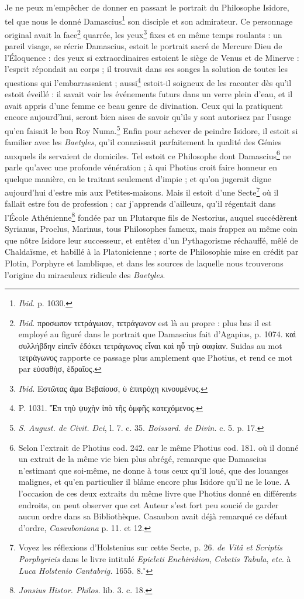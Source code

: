 \documentclass[a4paper, 11pt, oneside, polutonikogreek, french]{article}
\begin{document}
Je ne peux m'empêcher de donner en passant le portrait du Philosophe Isidore, tel que nous le donné Damascius\footnote{\emph{Ibid.} p. 1030.} son disciple et son admirateur. Ce personnage original avait la face\footnote{\emph{Ibid.} προσωπον τετράγωιον, τετράγωνον est là au propre : plus bas il est employé au figuré dans le portrait que Damascius fait d'Agapius, p. 1074. καὶ συλλήβδην εἰπεῖν ἐδόκει τετράγωνος εἶναι καὶ ηὖ τηὺ σαφἱαν. Suidas au mot τετράγωνος rapporte ce passage plus amplement que Photius, et rend ce mot par εὐσαθὴσ, ἑδραῖος.} quarrée, les yeux\footnote{\emph{Ibid.} Εστῶτας ἅμα Βεβαίουσ, ὺ ἐπιτρόχη κινουμένυς.} fixes et en même temps roulants : un pareil visage, se récrie Damascius, estoit le portrait sacré de Mercure Dieu de l'Éloquence : des yeux si extraordinaires estoient le siège de Venus et de Minerve : l'esprit répondait au corps ; il trouvait dans ses songes la solution de toutes les questions qui l'embarrassaient ; aussi\footnote{P. 1031. Ἔπ τηὺ ψυχὴν ἱπὸ τῆς ὀμφῆς κατεχόμενος.} estoit-il soigneux de les raconter dès qu'il estoit éveillé : il savait voir les événements futurs dans un verre plein d'eau, et il avait appris d'une femme ce beau genre de divination. Ceux qui la pratiquent encore aujourd’hui, seront bien aises de savoir qu'ils y sont autorisez par l'usage qu'en faisait le bon Roy Numa.\footnote{\emph{S. August. de Civit. Dei}, l. 7. c. 35. \emph{Boissard. de Divin.} c. 5. p. 17.} Enfin pour achever de peindre Isidore, il estoit si familier avec les \emph{Baetyles}, qu'il connaissait parfaitement la qualité des Génies auxquels ils servaient de domiciles. Tel estoit ce Philosophe dont Damascius\footnote{Selon l'extrait de Photius cod. 242. car le même Photius cod. 181. où il donné un extrait de la même vie bien plus abrégé, remarque que Damascius n'estimant que soi-même, ne donne à tous ceux qu'il loué, que des louanges malignes, et qu'en particulier il blâme encore plus Isidore qu'il ne le loue. A l'occasion de ces deux extraits du même livre que Photius donné en différents endroits, on peut observer que cet Auteur s'est fort peu soucié de garder aucun ordre dans sa Bibliothèque. Casaubon avait déjà remarqué ce défaut d'ordre, \emph{Casauboniana} p. 11. et 12.} ne parle qu'avec une profonde vénération ; à qui Photius croit faire honneur en quelque manière, en le traitant seulement d'impie ; et qu'on jugerait digne aujourd’hui d'estre mis aux Petites-maisons. Mais il estoit d'une Secte\footnote{Voyez les réflexions d'Holstenius sur cette Secte, p. 26. \emph{de Vitâ et Scriptis Porphyricis} dans le livre intitulé \emph{Epicleti Enchiridion}, \emph{Cebetis Tabula}, \emph{etc.} à \emph{Luca Holstenio Cantabrig.} 1655. 8.$^\circ$} où il fallait estre fou de profession ; car j'apprends d'ailleurs, qu'il régentait dans l'École Athénienne\footnote{\emph{Jonsius Histor. Philos.} lib. 3. c. 18.} fondée par un Plutarque fils de Nestorius, auquel succédèrent Syrianus, Proclus, Marinus, tous Philosophes fameux, mais frappez au même coin que nôtre Isidore leur successeur, et entêtez d'un Pythagorisme réchauffé, mêlé de Chaldaïsme, et habillé à la Platonicienne ; sorte de Philosophie mise en crédit par Plotin, Porphyre et Iamblique, et dans les sources de laquelle nous trouverons l'origine du miraculeux ridicule des \emph{Baetyles}.
\end{document}
